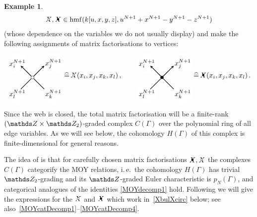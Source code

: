\documentclass{compositio}
\theoremstyle{definition}
\newtheorem{example}[theorem]{Example}
\numberwithin{equation}{section}
\DeclareMathOperator{\hmf}{hmf}
\begin{document}
\begin{example}
\[
\Xcirc, \Xbul \in \hmf( k[u,x,y,z], u^{N+1} +x^{N+1} - y^{N+1} - z^{N+1} )
\]
(whose dependence on the variables we do not usually display) and make the following assignments of matrix factorisations to vertices: 
\begin{equation}
\label{MFcrossings}
\begin{tikzpicture}[scale=0.7,baseline, inner sep=1mm, >=stealth]
\node (1) at (-1.1,1.0) [circle,inner sep=1.5pt, draw=white,fill= white] {$x^{N+1}_{i}$};
\node (2) at (1.5,1.0) [circle,inner sep=1.5pt, draw=white,fill= white] {$x^{N+1}_{j}$};
\node (3) at (1.5,-1.2) [circle,inner sep=1.5pt, draw=white,fill= white] {$x^{N+1}_{k}$};
\node (3) at (-1.1,-1.2) [circle,inner sep=1.5pt, draw=white,fill= white] {$x^{N+1}_{l}$};
\node (0) at (0,0) [circle,inner sep=1.5pt, thin,draw=black,fill= white] {};
\node (bl) at (-1,-1) [circle] {};
\node (br) at (1,-1) [circle] {};
\node (tl) at (-1,1) [circle] {};
\node (tr) at (1,1) [circle] {};
\draw[-,  thick] (bl) -- (0); 
\draw[-,  thick] (br) -- (0); 
\draw[->,  thick] (0) -- (tl); 
\draw[->,  thick] (0) -- (tr); 
\end{tikzpicture}
\widehat = \,
\Xcirc(x_{i},x_{j},x_{k},x_{l}) \, ,
\qquad 
\begin{tikzpicture}[scale=0.7,baseline, inner sep=1mm, >=stealth]
\node (1) at (-1.1,1.0) [circle,inner sep=1.5pt, draw=white,fill= white] {$x^{N+1}_{i}$};
\node (2) at (1.5,1.0) [circle,inner sep=1.5pt, draw=white,fill= white] {$x^{N+1}_{j}$};
\node (3) at (1.5,-1.2) [circle,inner sep=1.5pt, draw=white,fill= white] {$x^{N+1}_{k}$};
\node (3) at (-1.1,-1.2) [circle,inner sep=1.5pt, draw=white,fill= white] {$x^{N+1}_{l}$};
\node (0) at (0,0) [circle,inner sep=1.5pt, thin,draw=black,fill= black] {};
\node (bl) at (-1,-1) [circle] {};
\node (br) at (1,-1) [circle] {};
\node (tl) at (-1,1) [circle] {};
\node (tr) at (1,1) [circle] {};
\draw[-,  thick] (bl) -- (0); 
\draw[-,  thick] (br) -- (0); 
\draw[->,  thick] (0) -- (tl); 
\draw[->,  thick] (0) -- (tr); 
\end{tikzpicture}
\widehat = \,
\Xbul (x_{i},x_{j},x_{k},x_{l}) \, .
\end{equation}
Since the web is closed, the total matrix factorisation will be a finite-rank $(\ZZ \times \Ztwo)$-graded complex $C(\Gamma)$ over the polynomial ring of all edge variables. As we will see below, the cohomology $H(\Gamma)$ of this complex is finite-dimensional for general reasons.

The idea of \cite{kr0401268} is that for carefully chosen matrix factorisations $\Xbul, \Xcirc$ the complexes $C(\Gamma)$ categorify the MOY relations, i.\,e.~the cohomology $H(\Gamma)$ has trivial $\Ztwo$-grading and its $\ZZ$-graded Euler characteristic is $p_N(\Gamma)$, and categorical analogues of the identities \eqref{MOYdecomp1} hold. Following \cite{kr0401268} we will give the expressions for the $\Xcirc$ and $\Xbul$ which work in~\eqref{XbulXcirc} below; see also~\eqref{MOYcatDecomp1}--\eqref{MOYcatDecomp4}.
\end{example}
\end{document}
